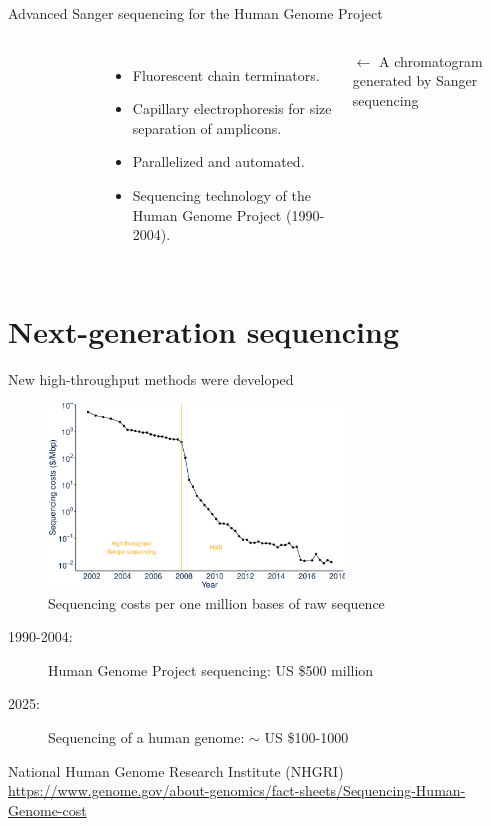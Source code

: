 \documentclass[10pt]{beamer}
\newcommand{\credit}[1]{{\vspace{\fill} \par \raggedleft \scriptsize \mdseries \color{mDarkBrown} #1 \par}}
\begin{document}
\begin{frame}{Advanced Sanger sequencing for the Human Genome Project}
\begin{columns}[T,onlytextwidth]
\begin{figure}
		\end{figure}
		\vspace{0.2cm}
		\begin{itemize}
			\item Fluorescent chain terminators.
			\item Capillary electrophoresis for size separation of amplicons.
			\item Parallelized and automated.
			\item Sequencing technology of the Human Genome Project (1990-2004).
		\end{itemize}
		\par \vspace{0.5cm}
		\credit{$\leftarrow$ A chromatogram generated by Sanger sequencing}
	\end{columns}
\end{frame}


\section{Next-generation sequencing}


\begin{frame}{New high-throughput methods were developed}
	\begin{center}
		 \begin{figure}
		\includegraphics[width=0.7\textwidth]{./figures/sequencingcosts2018eng.pdf}
		\caption{Sequencing costs per one million bases of raw sequence}
		\end{figure}
	\end{center}
    \begin{description}
	\item [1990-2004:] Human Genome Project sequencing: US \$500 million
	\item [2025:] Sequencing of a human genome: $\sim$ US \$100-1000
\end{description}
	\credit{National Human Genome Research Institute (NHGRI) \linebreak \href{https://www.genome.gov/about-genomics/fact-sheets/Sequencing-Human-Genome-cost}{https://www.genome.gov/about-genomics/fact-sheets/Sequencing-Human-Genome-cost}}
\end{frame}
\end{document}
